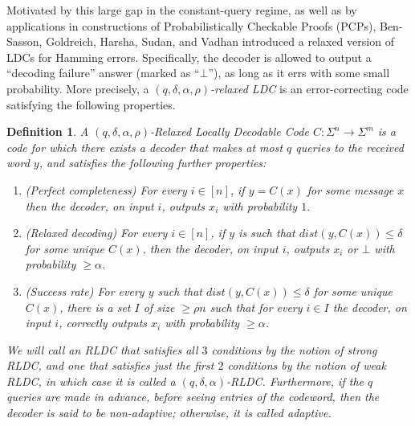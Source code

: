 \documentclass[10pt,a4paper]{article}
\newtheorem{definition}{Definition}
\theoremstyle{remark}
\newcommand{\eps}{\ensuremath{\varepsilon}}
\newcommand{\authnote}[3]{\textcolor{#2}{{\sf (#1's Note: {\sl{#3}})}}}
\newcommand{\minshen}{\authnote{Minshen}{purple}}
\newcommand{\authnote}{}
\newcommand{\minshen}[1]{}
\begin{document}
Motivated by this large gap in the constant-query regime, as well as by applications in constructions of Probabilistically Checkable Proofs (PCPs), Ben-Sasson, Goldreich, Harsha, Sudan, and Vadhan \cite{Ben-SassonGHSV06} introduced a relaxed version of LDCs for Hamming errors. Specifically, the decoder is allowed to output a ``decoding failure'' answer (marked as ``$\bot$''), as long as it errs with some small probability. More precisely,  a \emph{$(q,\delta, \alpha, \rho)$-relaxed LDC} is an error-correcting code satisfying the following properties.

\begin{definition}\label{def:strongRLDC} A $(q,\delta, \alpha, \rho)$-Relaxed Locally Decodable Code 
${C}: \Sigma^n \rightarrow \Sigma^m$ is a code for which there exists a decoder that makes at most $q$ queries to the received word $y$, and satisfies the following further properties:
\begin{enumerate} %
\item  (Perfect completeness) For every $i\in [n]$, if $y=C(x)$ for some message $x$ then the decoder, on input $i$, outputs $x_i$ with probability $1.$
\item  (Relaxed decoding) For every $i\in [n]$, if $y$ is such that $dist(y, C(x))\leq \delta $ for some unique $C(x)$, then the decoder, on input $i$, outputs $x_i$ or $\bot$ with probability   $\geq \alpha$. %
\item (Success rate) For every $y$ such that $dist(y, C(x))\leq \delta $ for some unique $C(x)$, there is a set $I$ of size $\geq \rho n$ such that for every $i\in I$ the decoder, on input $i$, correctly outputs $x_i$ with probability $\geq \alpha$. %
\end{enumerate}
We will call an RLDC that satisfies all $3$ conditions by the notion of {\em strong} RLDC, and one that satisfies just the first $2$ conditions by the notion of {\em weak} RLDC, in which case it is called a $(q,\delta, \alpha)$-RLDC. Furthermore,  if the $q$ queries are made in advance, before seeing entries of the codeword, then the decoder is said to be {\em non-adaptive}; otherwise, it is called {\em adaptive}.
\end{definition}

\end{document}
